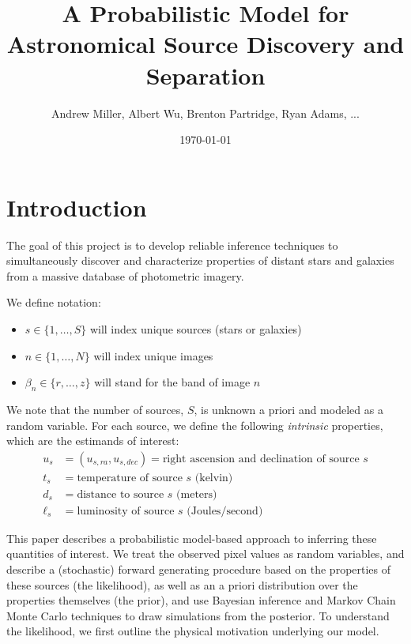 \documentclass[11pt]{article}
\title{A Probabilistic Model for Astronomical Source Discovery and Separation}
\author{Andrew Miller, Albert Wu, Brenton Partridge, Ryan Adams, ...}
\date{\today}
\begin{document}
\maketitle

\section{Introduction}

The goal of this project is to develop reliable inference techniques to simultaneously discover and characterize properties of distant stars and galaxies from a massive database of photometric imagery.  

We define notation: 
\begin{itemize} \itemsep 0pt
\item $s \in \{1, \dots, S\}$ will index unique sources (stars or galaxies)
\item $n \in \{1, \dots, N\}$ will index unique images
\item $\beta_n \in \{r, \dots, z\}$ will stand for the band of image $n$
\end{itemize}

We note that the number of sources, $S$, is unknown a priori and modeled as a random variable.  For each source, we define the following \emph{intrinsic} properties, which are the estimands of interest: 
\begin{align*}
  u_s &= (u_{s,ra}, u_{s,dec}) = \text{right ascension and declination of source $s$} \\
  t_s &= \text{temperature of source $s$ (kelvin)} \\
  d_s &= \text{distance to source $s$ (meters)} \\
  \ell_s &= \text{luminosity of source $s$ (Joules/second)} 
\end{align*}

This paper describes a probabilistic model-based approach to inferring these quantities of interest.  We treat the observed pixel values as random variables, and describe a (stochastic) forward generating procedure based on the properties of these sources (the likelihood), as well as an a priori distribution over the properties themselves (the prior), and use Bayesian inference and Markov Chain Monte Carlo techniques to draw simulations from the posterior.  To understand the likelihood, we first outline the physical motivation underlying our model.  
\end{document}
